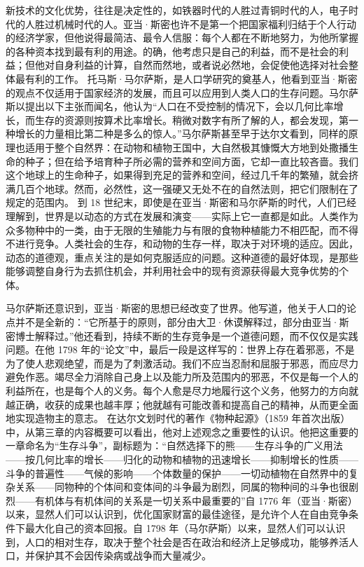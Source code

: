 新技术的文化优势，往往是决定性的，如铁器时代的人胜过青铜时代的人，电子时代的人胜过机械时代的人。亚当·斯密也许不是第一个把国家福利归结于个人行动的经济学家，但他说得最简洁、最令人信服：每个人都在不断地努力，为他所掌握的各种资本找到最有利的用途。的确，他考虑只是自己的利益，而不是社会的利益；但他对自身利益的计算，自然而然地，或者说必然地，会促使他选择对社会整体最有利的工作。 托马斯·马尔萨斯，是人口学研究的奠基人，他看到亚当·斯密的观点不仅适用于国家经济的发展，而且可以应用到人类人口的生存问题。马尔萨斯以提出以下主张而闻名，他认为“人口在不受控制的情况下，会以几何比率增长，而生存的资源则按算术比率增长。稍微对数字有所了解的人，都会发现，第一种增长的力量相比第二种是多么的惊人。”马尔萨斯甚至早于达尔文看到，同样的原理也适用于整个自然界：在动物和植物王国中，大自然极其慷慨大方地到处撒播生命的种子；但在给予培育种子所必需的营养和空间方面，它却一直比较吝啬。我们这个地球上的生命种子，如果得到充足的营养和空间，经过几千年的繁殖，就会挤满几百个地球。然而，必然性，这一强硬又无处不在的自然法则，把它们限制在了规定的范围内。 到 18 世纪末，即使是在亚当·斯密和马尔萨斯的时代，人们已经理解到，世界是以动态的方式在发展和演变——实际上它一直都是如此。人类作为众多物种中的一类，由于无限的生殖能力与有限的食物种植能力不相匹配，而不得不进行竞争。人类社会的生存，和动物的生存一样，取决于对环境的适应。因此，动态的道德观，重点关注的是如何克服适应的问题。这种道德的最好体现，是那些能够调整自身行为去抓住机会，并利用社会中的现有资源获得最大竞争优势的个体。

马尔萨斯还意识到，亚当·斯密的思想已经改变了世界。他写道，他关于人口的论点并不是全新的：“它所基于的原则，部分由大卫·休谟解释过，部分由亚当·斯密博士解释过。”他还看到，持续不断的生存竞争是一个道德问题，而不仅仅是实践问题。在他 1798 年的“论文”中，最后一段是这样写的：世界上存在着邪恶，不是为了使人悲观绝望，而是为了刺激活动。我们不应当忍耐和屈服于邪恶，而应尽力避免作恶。竭尽全力消除自己身上以及能力所及范围内的邪恶，不仅是每一个人的利益所在，也是每个人的义务。每个人愈是尽力地履行这个义务，他努力的方向就越正确，收获的成果也越丰厚；他就越有可能改善和提高自己的精神，从而更全面地实现造物主的意志。 在达尔文划时代的著作《物种起源》（1859 年首次出版）中，从第三章的内容概要可以看出，他对上述观念之重要性的认识。他把这重要的一章命名为“生存斗争”，副标题为：“自然选择下的熊——生存斗争的广义用法——按几何比率的增长——归化的动物和植物的迅速增长——抑制增长的性质——斗争的普遍性——气候的影响——个体数量的保护——一切动植物在自然界中的复杂关系——同物种的个体间和变体间的斗争最为剧烈，同属的物种间的斗争也很剧烈——有机体与有机体间的关系是一切关系中最重要的”自 1776 年（亚当·斯密）以来，显然人们可以认识到，优化国家财富的最佳途径，是允许个人在自由竞争条件下最大化自己的资本回报。自 1798 年（马尔萨斯）以来，显然人们可以认识到，人口的相对生存，取决于整个社会是否在政治和经济上足够成功，能够养活人口，并保护其不会因传染病或战争而大量减少。

